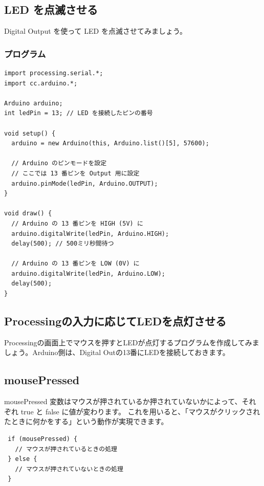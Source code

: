\documentclass[11pt,a4paper]{jarticle}
\begin{document}
\subsection{LED を点滅させる}
Digital Output を使って LED を点滅させてみましょう。

\subsubsection*{プログラム}
\begin{lstlisting}
import processing.serial.*;
import cc.arduino.*;
 
Arduino arduino;
int ledPin = 13; // LED を接続したピンの番号
 
void setup() {
  arduino = new Arduino(this, Arduino.list()[5], 57600);

  // Arduino のピンモードを設定
  // ここでは 13 番ピンを Output 用に設定
  arduino.pinMode(ledPin, Arduino.OUTPUT);
}
 
void draw() {
  // Arduino の 13 番ピンを HIGH (5V) に
  arduino.digitalWrite(ledPin, Arduino.HIGH);
  delay(500); // 500ミリ秒間待つ

  // Arduino の 13 番ピンを LOW (0V) に
  arduino.digitalWrite(ledPin, Arduino.LOW);
  delay(500);
}
\end{lstlisting}

\subsection{Processingの入力に応じてLEDを点灯させる}
Processingの画面上でマウスを押すとLEDが点灯するプログラムを作成してみましょう。Arduino側は、Digital Outの13番にLEDを接続しておきます。

\subsection*{mousePressed}
mousePressed 変数はマウスが押されているか押されていないかによって、それぞれ true と false に値が変わります。
これを用いると、「マウスがクリックされたときに何かをする」という動作が実現できます。

\begin{lstlisting}
 if (mousePressed) {
   // マウスが押されているときの処理
 } else {
   // マウスが押されていないときの処理
 }
\end{lstlisting}
\end{document}
